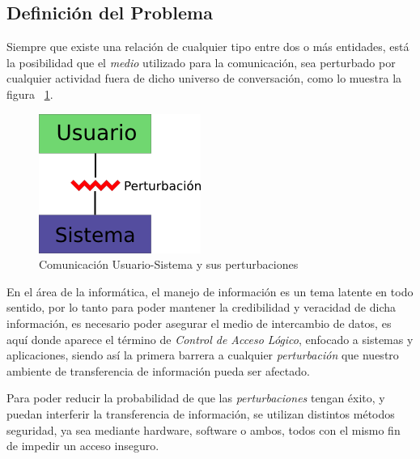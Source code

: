 
\subsection{Definición del Problema}
	Siempre que existe una relación de cualquier tipo entre dos o más entidades,
	está la posibilidad que el \emph{medio} utilizado para la comunicación,
	sea perturbado por cualquier actividad fuera de dicho universo de conversación,
	como lo muestra la figura ~\ref{fig:fig1}.

	\begin{figure}[htp]
		\centering
		\includegraphics[scale=0.3]{img/user-sist}
		\caption{Comunicación Usuario-Sistema y sus perturbaciones}
		\label{fig:fig1}
	\end{figure}

	En el área de la informática, el manejo de información es un tema latente
	en todo sentido, por lo tanto para poder mantener la credibilidad y veracidad de
	dicha información, es necesario poder asegurar el medio de intercambio de datos,
	es aquí donde aparece el término de \emph{Control de Acceso Lógico},
	enfocado a sistemas y aplicaciones, siendo así la primera barrera a cualquier
	\emph{perturbación} que nuestro ambiente de transferencia de información pueda
	ser afectado.

	Para poder reducir la probabilidad de que las \emph{perturbaciones} tengan éxito,
	y puedan interferir la transferencia de información, se utilizan distintos métodos
	seguridad, ya sea mediante hardware, software o ambos, todos con el mismo fin de
	impedir un acceso inseguro.

